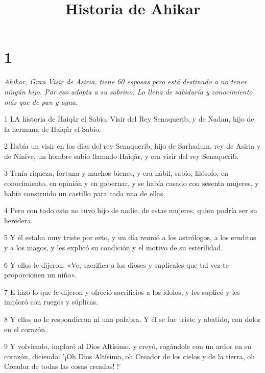 

\title{Historia de Ahikar}

\chapter{1}

\par \textit{Ahikar, Gran Visir de Asiria, tiene 60 esposas pero está destinado a no tener ningún hijo. Por eso adopta a su sobrino. Lo llena de sabiduría y conocimiento más que de pan y agua.}

\par 1 LA historia de Haiqâr el Sabio, Visir del Rey Senaquerib, y de Nadan, hijo de la hermana de Haiqâr el Sabio.

\par 2 Había un visir en los días del rey Senaquerib, hijo de Sarhadum, rey de Asiria y de Nínive, un hombre sabio llamado Haiqâr, y era visir del rey Senaquerib.

\par 3 Tenía riqueza, fortuna y muchos bienes, y era hábil, sabio, filósofo, en conocimiento, en opinión y en gobernar, y se había casado con sesenta mujeres, y había construido un castillo para cada una de ellas.

\par 4 Pero con todo esto no tuvo hijo de nadie. de estas mujeres, quien podría ser su heredera.

\par 5 Y él estaba muy triste por esto, y un día reunió a los astrólogos, a los eruditos y a los magos, y les explicó su condición y el motivo de su esterilidad.

\par 6 Y ellos le dijeron: «Ve, sacrifica a los dioses y suplicales que tal vez te proporcionen un niño».

\par 7 E hizo lo que le dijeron y ofreció sacrificios a los ídolos, y les suplicó y les imploró con ruegos y súplicas.

\par 8 Y ellos no le respondieron ni una palabra. Y él se fue triste y abatido, con dolor en el corazón.

\par 9 Y volviendo, imploró al Dios Altísimo, y creyó, rogándole con un ardor en su corazón, diciendo: '¡Oh Dios Altísimo, oh Creador de los cielos y de la tierra, oh Creador de todas las cosas creadas! !'

